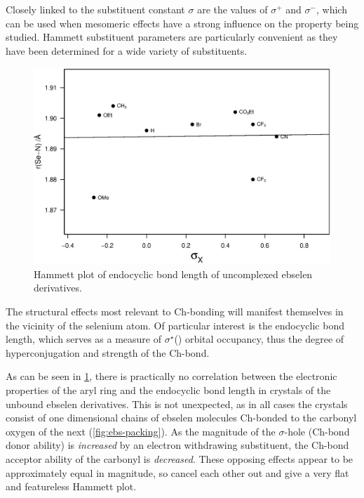 \begin{refsection}
Closely linked to the substituent constant $\sigma$ are the values of $\sigma^{+}$ and $\sigma^{-}$, which can be used when mesomeric effects have a strong influence on the property being studied.
Hammett substituent parameters are particularly convenient as they have been determined for a wide variety of substituents.

\begin{figure}
    \centering
    \includegraphics[width=0.9\linewidth]{Figures/hammett-endo-free.eps}
    \caption{Hammett plot of endocyclic  bond length of uncomplexed ebselen derivatives.}
    \label{fig:hammett-endo-free}
\end{figure}

The structural effects most relevant to Ch-bonding will manifest themselves in the vicinity of the selenium atom.
Of particular interest is the endocyclic  bond length, which serves as a measure of $\sigma^\star$() orbital occupancy, thus the degree of hyperconjugation and strength of the Ch-bond.

As can be seen in \cref{fig:hammett-endo-free}, there is practically no correlation between the electronic properties of the aryl ring and the endocyclic  bond length in crystals of the unbound ebselen derivatives.
This is not unexpected, as in all cases the crystals consist of one dimensional chains of ebselen molecules Ch-bonded to the carbonyl oxygen of the next (\cref{fig:ebs-packing}).
As the magnitude of the $\sigma$-hole (Ch-bond donor ability) is \emph{increased} by an electron withdrawing substituent, the Ch-bond acceptor ability of the carbonyl is \emph{decreased}.
These opposing effects appear to be approximately equal in magnitude, so cancel each other out and give a very flat and featureless Hammett plot.


\end{refsection}
